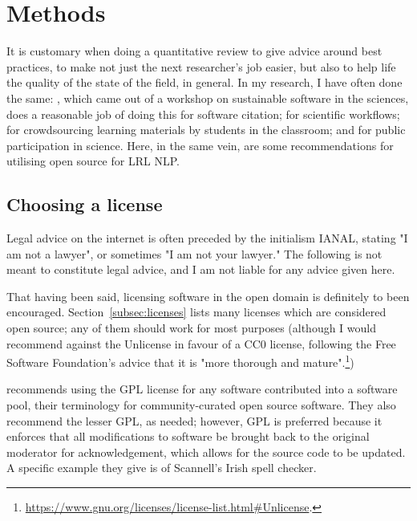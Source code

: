 \section{Methods}
\label{sec:methods}

It is customary when doing a quantitative review to give advice around best practices, to make not just the next researcher's job easier, but also to help life the quality of the state of the field, in general. In my research, I have often done the same: \citet{DBLP:journals/corr/KatzCWHVHSJCCVL15}, which came out of a workshop on sustainable software in the sciences, does a reasonable job of doing this for software citation; \citet{LittIDCC} for scientific workflows; \citet{LittEdulearn} for crowdsourcing learning materials by students in the classroom; and \citet{wiggins2013data} for public participation in science. Here, in the same vein, are some recommendations for utilising open source for LRL NLP.

\subsection{Choosing a license}
\label{choosing-a-license}

Legal advice on the internet is often preceded by the initialism IANAL, stating "I am not a lawyer", or sometimes "I am not your lawyer." The following is not meant to constitute legal advice, and I am not liable for any advice given here.

That having been said, licensing software in the open domain is definitely to been encouraged. Section~\ref{subsec:licenses} lists many licenses which are considered open source; any of them should work for most purposes (although I would recommend against the Unlicense in favour of a CC0 license, following the Free Software Foundation's advice that it is "more thorough and mature".\footnote{\href{https://www.gnu.org/licenses/license-list.html\#Unlicense}{https://www.gnu.org/licenses/license-list.html\#Unlicense}. })

\citet{streiter2006implementing} recommends using the GPL license for any software contributed into a software pool, their terminology for community-curated open source software. They also recommend the lesser GPL, as needed; however, GPL is preferred because it enforces that all modifications to software be brought back to the original moderator for acknowledgement, which allows for the source code to be updated. A specific example they give is of Scannell's Irish spell checker.

